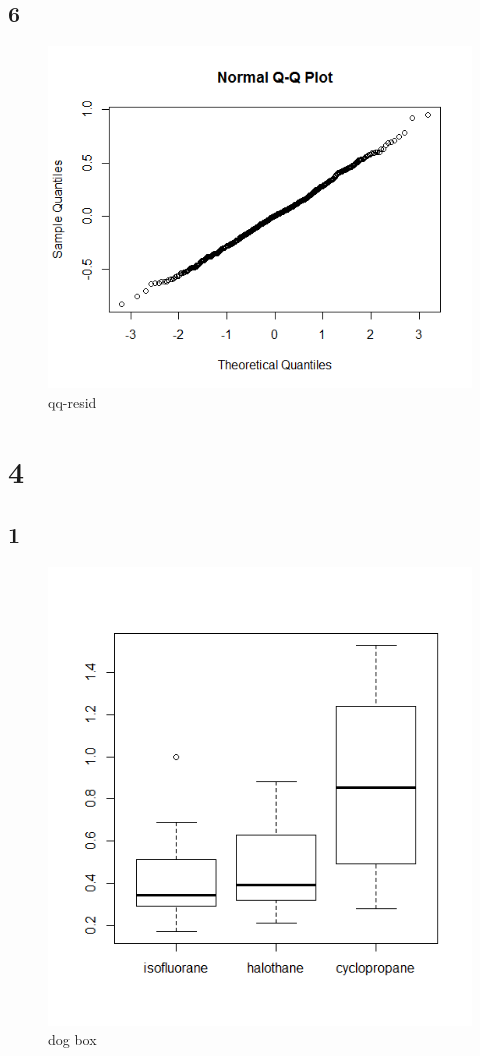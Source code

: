 \documentclass{article}
\begin{document}
    \subsection*{6}
    \begin{figure}[!htb]
    \centering
      \includegraphics[scale=0.4]{../results/3_6.png}
      \caption{qq-resid}
      \label{fig:qq-resid}
    \end{figure}
    
    \section{4}
    \subsection*{1}
    \begin{figure}[!htb]
    \centering
      \includegraphics[scale=0.4]{../results/4_1.png}
      \caption{dog box}
      \label{fig:dbox}
    \end{figure}
\end{document}
